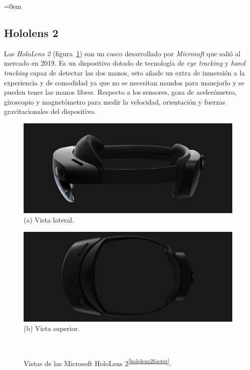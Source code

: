 \parindent=0em
\subsection{Hololens 2}
\label{HoloLens2Dispositivo}
\noindent

Las \textit{HoloLens 2} (figura~\ref{fig:vistasHoloLens2}) son un casco desarrollado por \textit{Microsoft} que salió al mercado en 2019. Es un dispositivo dotado de tecnología de \textit{eye tracking} y \textit{hand tracking} capaz de detectar las dos manos, esto añade un extra de inmersión a la experiencia y de comodidad ya que no se necesitan mandos para manejarlo y se pueden tener las manos libres. Respecto a los sensores, goza de acelerómetro, giroscopio y magnetómetro para medir la velocidad, orientación y fuerzas gravitacionales del dispositivo.\\


\begin{figure}[htbp]
\centering
    \hspace{-4mm}
    \begin{minipage}{0.5\textwidth}
        \centering
        \includegraphics[scale=0.2]{Images/Estado del arte/hololens2_2.jpeg}\\
        (a) Vista lateral.
    \end{minipage}
    \begin{minipage}{0.5\textwidth}
        \centering
        \includegraphics[scale=0.2]{Images/Estado del arte/hololens2_3.jpeg}\\
       (b) Vista superior.
    \end{minipage}\\
    \caption{Vistas de las Microsoft HoloLens 2\textsuperscript{\ref{hololens2footer}}.}
    \label{fig:vistasHoloLens2}
\end{figure}


